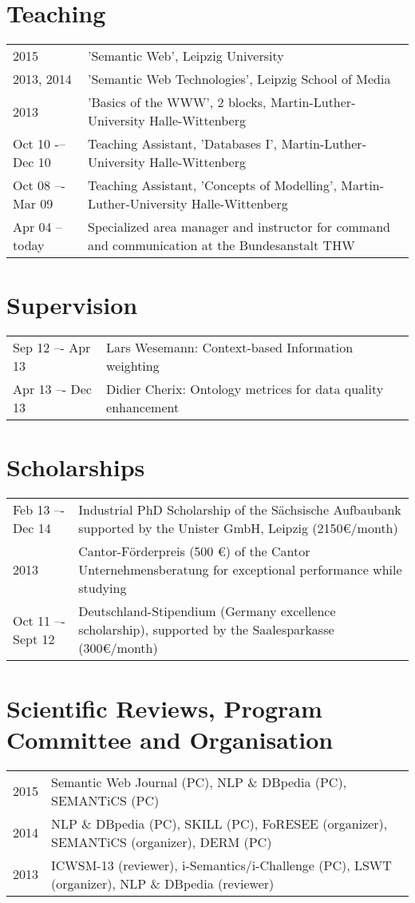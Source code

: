 \section*{Teaching}
\begin{tabular}{p{3cm}p{10cm}}	
2015		    & 'Semantic Web', Leipzig University\\
2013, 2014	    & 	'Semantic Web Technologies', Leipzig School of Media\\
2013		    & 'Basics of the WWW', 2 blocks, Martin-Luther-University Halle-Wittenberg\\
Oct 10 -– Dec 10	& 	Teaching Assistant, 'Databases I', Martin-Luther-University Halle-Wittenberg\\
Oct 08 –- Mar 09	& 	Teaching Assistant, 'Concepts of Modelling', Martin-Luther-University Halle-Wittenberg\\
Apr 04 -- today	& Specialized area manager and instructor for command and communication at the Bundesanstalt THW\\
\end{tabular}

\section*{Supervision}
\begin{tabular}{p{3cm}p{10cm}}	
Sep 12 –- Apr 13 	& 	Lars Wesemann: Context-based Information weighting\\
Apr 13 –- Dec 13 	& 	Didier Cherix: Ontology metrices for data quality enhancement
\end{tabular}

\section*{Scholarships}
\begin{tabular}{p{3cm}p{10cm}}	
Feb 13 –- Dec 14 	& 	Industrial PhD Scholarship of the Sächsische Aufbaubank supported by the Unister GmbH, Leipzig (2150€/month)\\
2013	        	&   Cantor-Förderpreis (500 €) of the Cantor Unternehmensberatung for exceptional performance while studying\\
Oct 11 –- Sept 12 	& 	Deutschland-Stipendium (Germany excellence scholarship), supported by the Saalesparkasse (300€/month)\\
\end{tabular}

\section*{Scientific Reviews, Program Committee and Organisation}
\begin{tabular}{p{3cm}p{10cm}}	
2015        & Semantic Web Journal (PC), NLP \& DBpedia (PC), SEMANTiCS (PC)\\
2014		& NLP \& DBpedia (PC), SKILL (PC), FoRESEE (organizer), SEMANTiCS  (organizer), DERM (PC)\\
2013		& ICWSM-13 (reviewer), i-Semantics/i-Challenge (PC), LSWT (organizer), NLP \& DBpedia (reviewer)\\
\end{tabular}

